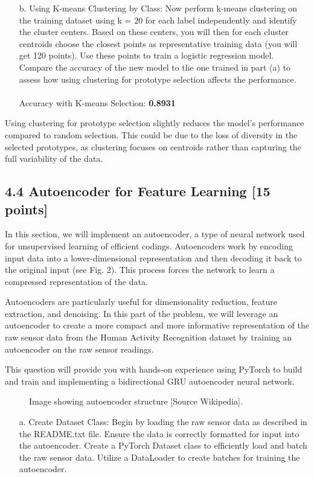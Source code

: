 \documentclass[a3paper,12pt]{extarticle} %
\begin{document}
\begin{enumerate}
\begin{itemize}
\item[b.] Using K-means Clustering by Class: Now perform k-means clustering on the training dataset using k = 20 for each label independently and identify the cluster centers. Based on these centers, you will then for each cluster centroids choose the closest points as representative training data (you will get 120 points). Use these points to train a logistic regression model. Compare the accuracy of the new model to the one trained in part (a) to assess how using clustering for prototype selection affects the performance.
\\\\ Accuracy with K-means Selection: \textbf{0.8931}\\
\end{itemize}
Using clustering for prototype selection slightly reduces the model's performance compared to random selection. This could be due to the loss of diversity in the selected prototypes, as clustering focuses on centroids rather than capturing the full variability of the data.

\subsection*{4.4 Autoencoder for Feature Learning [15 points]}
In this section, we will implement an autoencoder, a type of neural network used for unsupervised learning of efficient codings. Autoencoders work by encoding input data into a lower-dimensional representation and then decoding it back to the original input (see Fig. 2). This process forces the network to learn a compressed representation of the data.

Autoencoders are particularly useful for dimensionality reduction, feature extraction, and denoising. In this part of the problem, we will leverage an autoencoder to create a more compact and more informative representation of the raw sensor data from the Human Activity Recognition dataset by training an autoencoder on the raw sensor readings.

This question will provide you with hands-on experience using PyTorch to build and train and implementing a bidirectional GRU autoencoder neural network.

\begin{figure}[h]
\centering
\caption{Image showing autoencoder structure [Source Wikipedia].}
\end{figure}

\begin{itemize}
\item[a.] Create Dataset Class: Begin by loading the raw sensor data as described in the README.txt file. Ensure the data is correctly formatted for input into the autoencoder. Create a PyTorch Dataset class to efficiently load and batch the raw sensor data. Utilize a DataLoader to create batches for training the autoencoder.


\end{itemize}
\end{enumerate}
\end{document}
